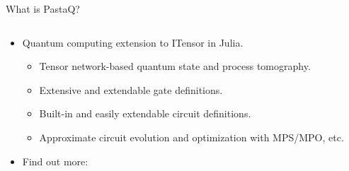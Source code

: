 \begin{frame}{What is PastaQ?}
\begin{columns}
\end{columns}

\begin{itemize}[<+->]

  \item Quantum computing extension to ITensor in Julia.

  \begin{itemize}[<+->]

    \item Tensor network-based quantum state and process tomography. 
    \item Extensive and extendable gate definitions.
    \item Built-in and easily extendable circuit definitions.
    \item Approximate circuit evolution and optimization with MPS/MPO, etc.

  \end{itemize}

  \item Find out more: 

\end{itemize}

\end{frame}

